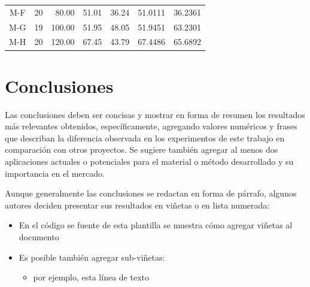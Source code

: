 \documentclass[fleqn,10pt]{SelfArx} %
\begin{document}
\begin{table}[ht!]
\begin{tabular}{c|crrrr|r}
        M-F         & 20                & 80.00                                                    & 51.01                                                    & 36.24                                    & 51.0111                                          & 36.2361                                          \\
        M-G         & 19                & 100.00                                                   & 51.95                                                    & 48.05                                    & 51.9451                                          & 63.2301                                          \\
        M-H         & 20                & 120.00                                                   & 67.45                                                    & 43.79                                    & 67.4486                                          & 65.6892                                         \\
        \bottomrule
    
    \end{tabular}

\label{tab:adsorcion}
\end{table}

\section{Conclusiones} %
\label{sec:conclusiones} %

Las conclusiones deben ser concisas y mostrar en forma de resumen los resultados más relevantes obtenidos, específicamente, agregando valores numéricos y frases que describan la diferencia observada en los experimentos de este trabajo en comparación con otros proyectos. Se sugiere también agregar al menos dos aplicaciones actuales o potenciales para el material o método desarrollado y su importancia en el mercado.

Aunque generalmente las conclusiones se redactan en forma de párrafo, algunos autores deciden presentar sus resultados en viñetas o en lista numerada:\vspace{1ex}

\begin{itemize}
    \item En el código se fuente de esta plantilla se muestra cómo agregar viñetas al documento
    \item Es posible también agregar sub-viñetas:
    \begin{itemize}
        \item por ejemplo, esta línea de texto
    \end{itemize}
\end{itemize}
\end{document}
